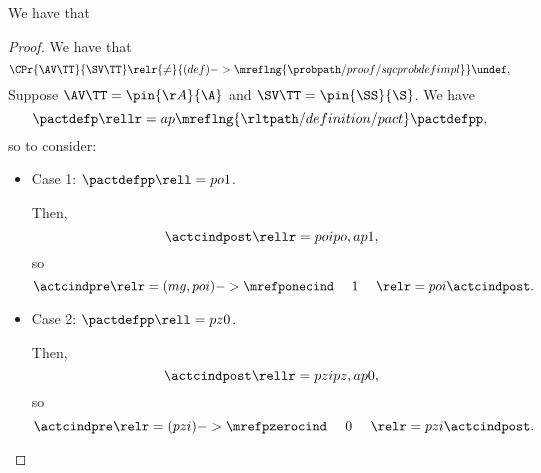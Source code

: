 \begin{proposition}
  We have that %
\end{proposition}

\begin{proof}
  We have that
  $$\CPr{\AV\TT}{\SV\TT} \relr {\ne} {(def)->\mreflng{\probpath/proof/sqcprobdefimpl}} \undef,$$
  Suppose 
  $\AV\TT = \pin{\AA}{\A}$
  and
  $\SV\TT = \pin{\SS}{\S}$. We have
  $$\pactdefp \rellr = ap {\mreflng{\rltpath/definition/pact}} \pactdefpp,$$
  so  to consider:
  \begin{itemize}
    \item {} Case 1: $\pactdefpp \rell = po 1$.

      Then,
      $$\actcindpost \rellr = poi po,ap 1,$$
      so
      $$\actcindpre \relr = (mg,poi)->{\mrefponecind} \ \ \ \ 1\ \ \ \ \relr = poi \actcindpost.$$
    \item {} Case 2: $\pactdefpp \rell = pz 0$.

      Then,
      $$\actcindpost \rellr = pzi pz,ap 0,$$
      so
      $$\actcindpre \relr = (pzi)->{\mrefpzerocind} \ \ \ \ 0\ \ \ \ \relr = pzi \actcindpost.$$
  \end{itemize}
\end{proof}

